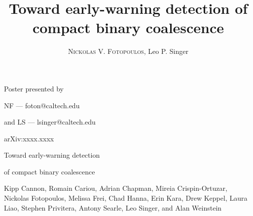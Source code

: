 \documentclass[portrait,plainboxedsections]{sciposter}
\title{Toward early-warning detection of compact binary coalescence}
\author{\textsc{Nickolas V. Fotopoulos}, Leo P. Singer}
\institute{\LIGO{} Laboratory, California Institute of Technology}
\begin{document}

\begin{minipage}[b]{0.25\textwidth}
\raggedleft
{\fontsize{36}{50}\selectfont
Poster presented by

NF --- foton@caltech.edu

and LS --- lsinger@caltech.edu

}
\vspace{32mm}

\fontsize{36}{40}\selectfont
arXiv:xxxx.xxxx
\end{minipage}%
\hspace{0.05\textwidth}%
\begin{minipage}[b]{0.6\textwidth}
{\fontsize{80}{100}\selectfont%
Toward early-warning detection

of compact binary coalescence

\vspace{0.5em}
\fontsize{30}{40}\selectfont
	Kipp Cannon,
	Romain Cariou,
	Adrian Chapman,
	Mireia Crispin-Ortuzar,
	Nickolas Fotopoulos,
	Melissa Frei,
	Chad Hanna,
	Erin Kara,
	Drew Keppel,
	Laura Liao,
	Stephen Privitera,
	Antony Searle,
	Leo Singer, and
	Alan Weinstein

}
\end{minipage}
\vspace{1cm}
\end{document}
